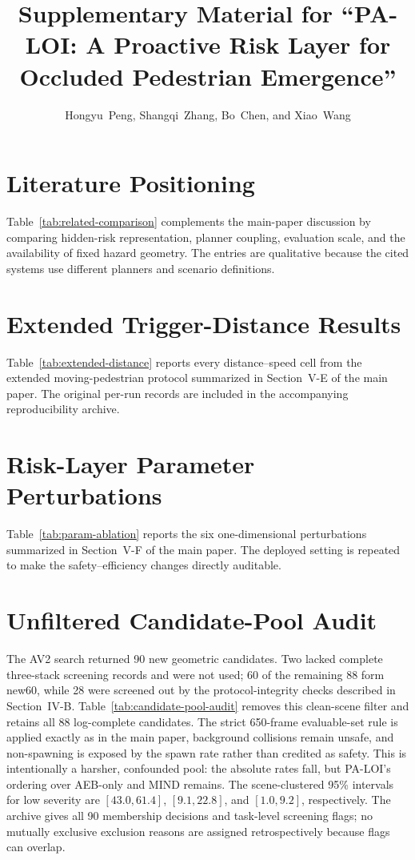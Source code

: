 \documentclass[journal,onecolumn]{IEEEtran}
\title{Supplementary Material for ``PA-LOI: A Proactive Risk Layer for Occluded Pedestrian Emergence''}
\author{Hongyu~Peng, Shangqi~Zhang, Bo~Chen, and Xiao~Wang}
\begin{document}
\maketitle

\section{Literature Positioning}

Table~\ref{tab:related-comparison} complements the main-paper discussion by
comparing hidden-risk representation, planner coupling, evaluation scale, and
the availability of fixed hazard geometry. The entries are qualitative because
the cited systems use different planners and scenario definitions.



\section{Extended Trigger-Distance Results}

Table~\ref{tab:extended-distance} reports every distance--speed cell from the
extended moving-pedestrian protocol summarized in Section~V-E of the main
paper. The original per-run records are included in the accompanying
reproducibility archive.



\section{Risk-Layer Parameter Perturbations}

Table~\ref{tab:param-ablation} reports the six one-dimensional perturbations
summarized in Section~V-F of the main paper. The deployed setting is repeated
to make the safety--efficiency changes directly auditable.



\section{Unfiltered Candidate-Pool Audit}

The AV2 search returned 90 new geometric candidates. Two lacked complete
three-stack screening records and were not used; 60 of the remaining 88 form
new60, while 28 were screened out by the protocol-integrity checks described
in Section~IV-B. Table~\ref{tab:candidate-pool-audit} removes this clean-scene
filter and retains all 88 log-complete candidates. The strict 650-frame
evaluable-set rule is applied exactly as in the main paper, background
collisions remain unsafe, and non-spawning is exposed by the spawn rate rather
than credited as safety. This is intentionally a harsher, confounded pool: the
absolute rates fall, but PA-LOI's ordering over AEB-only and MIND remains. The
scene-clustered 95\% intervals for low severity are $[43.0,61.4]$, $[9.1,22.8]$,
and $[1.0,9.2]$, respectively. The archive gives all 90 membership decisions
and task-level screening flags; no mutually exclusive exclusion reasons are
assigned retrospectively because flags can overlap.
\end{document}
